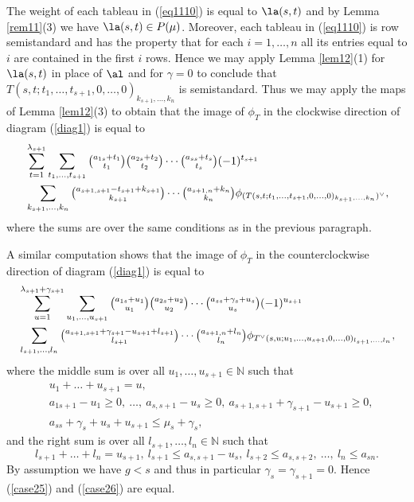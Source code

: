 	The weight of each tableau in (\ref{eq1110}) is equal to $\la(s,t)$ and by Lemma \ref{rem11}(3) we have $\la(s,t) \in P(\mu)$. Moreover, each tableau in (\ref{eq1110}) is row semistandard and has the property that for each $i=1,\dots,n$ all its entries equal to $i$ are contained in the first $i$ rows.  Hence we may apply Lemma \ref{lem12}(1) for $\la(s,t)$ in place of $\al$ and for $\gamma=0$ to conclude that $T(s,t;t_1,\dots,t_{s+1},0,\dots,0)_{k_{s+1},\dots,k_n}$ is semistandard. Thus we may apply the maps of Lemma \ref{lem12}(3) to obtain that the image of $\phi_T$ in the clockwise direction of diagram (\ref{diag1}) is equal to 
	\begin{align}\label{case25}
		&\sum_{t=1}^{\lambda_{s+1}}\sum_{\substack{t_1,\dots,t_{s+1}}}\tbinom{a_{1s}+t_1}{t_1}\tbinom{a_{2s}+t_2}{t_2} \cdots \tbinom{a_{ss}+t_s}{t_s}(-1)^{t_{s+1}}\\& \sum_{k_{s+1},\dots,k_n}\tbinom{a_{s+1,s+1}-t_{s+1}+k_{s+1}}{k_{s+1}}\cdots\tbinom{a_{s+1,n}+k_n}{k_n}\phi_{(T(s,t;t_1,\dots,t_{s+1},0,\dots,0)_{k_{s+1},\dots,k_n})^{\vee}}\nonumber,
	\end{align} where the sums are over the same conditions as in the previous paragraph.
	
A similar computation shows that the image of $\phi_T$ in the counterclockwise direction of diagram (\ref{diag1}) is equal to \begin{align}\label{case26}
	&\sum_{u=1}^{\lambda_{s+1}+\gamma_{s+1}}\sum_{u_1,\dots,u_{s+1}}\tbinom{a_{1s}+u_1}{u_1}\tbinom{a_{2s}+u_2}{u_2} \cdots \tbinom{a_{ss} + \gamma_s + u_s}{u_s}(-1)^{u_{s+1}}\\& \sum_{l_{s+1},\dots,l_n}\tbinom{a_{s+1,s+1}+\gamma_{s+1}-u_{s+1}+l_{s+1}}{l_{s+1}}\cdots\tbinom{a_{s+1,n}+l_n}{l_n}\phi_{T^{\vee}(s,u;u_1,\dots,u_{s+1},0,\dots,0)_{l_{s+1},\dots,l_n}}\nonumber,
\end{align} where the middle sum is over all  $u_1,\dots,u_{s+1} \in \mathbb{N}$ such that \begin{align}\label{case27}&u_{1}+\dots+u_{s+1}=u,\\\label{case28}&a_{1s+1}-u_1 \ge 0, \ \dots, \ a_{s,s+1}-u_{s} \ge 0, \ a_{s+1,s+1}+\gamma_{s+1}-u_{s+1} \ge 0, \\\label{case29}&a_{ss} + \gamma_s +u_s+u_{s+1}  \le \mu_s +\gamma_s,\end{align}
and the right sum is over all 
$l_{s+1},\dots, l_n \in \mathbb{N}$ such that \begin{equation}\label{case211}l_{s+1}+\dots+l_n=u_{s+1}, \  l_{s+1} \le a_{s,s+1}-u_s, \  l_{s+2} \le a_{s,s+2}, \  \dots, \  l_n \le a_{sn}.\end{equation} 
By assumption we have $g<s$ and thus in particular $\gamma_s = \gamma_{s+1}=0$. Hence (\ref{case25}) and (\ref{case26}) are equal.

